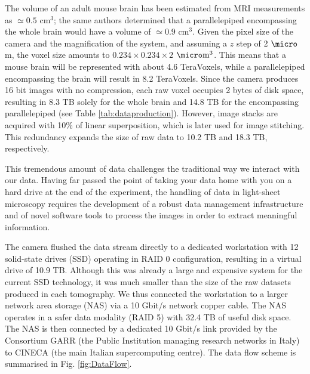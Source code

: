 \documentclass[12pt]{spieman}  %
\begin{document}
\begin{spacing}{2}
The volume of an adult mouse brain has been estimated from MRI measurements \cite{Kovacevic2005} as $\simeq 0.5$ $\text{cm}^3$; the same authors determined that a parallelepiped encompassing the whole brain would have a volume of $\simeq 0.9$ $\text{cm}^3$. Given the pixel size of the camera and the magnification of the system, and assuming a $z$ step of 2 $\micro$m, the voxel size amounts to $0.234\times0.234\times2$ $\micro\text{m}^3$. This means that a mouse brain will be represented with about 4.6 TeraVoxels, while a parallelepiped encompassing the brain will result in 8.2 TeraVoxels. Since the camera produces 16 bit images with no compression, each raw voxel occupies 2 bytes of disk space, resulting in 8.3 TB solely for the whole brain and 14.8 TB for the encompassing parallelepiped (see Table \ref{tab:dataproduction}). However, image stacks are acquired with 10\% of linear superposition, which is later used for image stitching. This redundancy expands the size of raw data to 10.2 TB and 18.3 TB, respectively.

This tremendous amount of data challenges the traditional way we interact with our data. Having far passed the point of taking your data home with you on a hard drive at the end of the experiment, the handling of data in light-sheet microscopy requires the development of a robust data management infrastructure and of novel software tools to process the images in order to extract meaningful information.

The camera flushed the data stream directly to a dedicated workstation with 12 solid-state drives (SSD) operating in RAID 0 configuration, resulting in a virtual drive of 10.9 TB. Although this was already a large and expensive system for the current SSD technology, it was much smaller than the size of the raw datasets produced in each tomography. We thus connected the workstation to a larger network area storage (NAS) via a 10 Gbit/s network copper cable. The NAS operates in a safer data modality (RAID 5) with 32.4 TB of useful disk space. The NAS is then connected by a dedicated 10 Gbit/s link provided by the Consortium GARR (the Public Institution managing research networks in Italy) to CINECA (the main Italian supercomputing centre). The data flow scheme is summarised in Fig. \ref{fig:DataFlow}.


\end{spacing}
\end{document}
